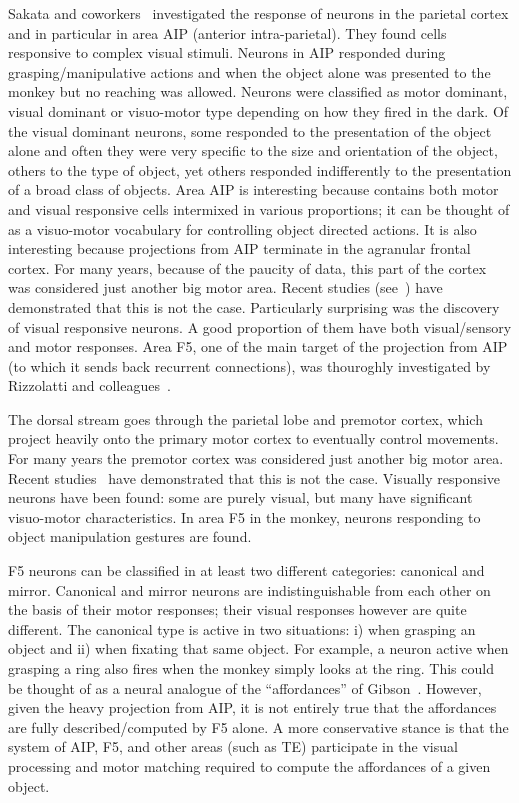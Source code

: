 Sakata and coworkers~\cite{sakata-taira-kusunoki-murata-tanaka-1997} 
investigated the response of neurons in the 
parietal cortex and in particular in area AIP (anterior intra-parietal). They found 
cells responsive to complex visual stimuli. Neurons in AIP responded during 
grasping/manipulative actions and when the object alone was presented to the 
monkey but no reaching was allowed. Neurons were classified as motor dominant, 
visual dominant or visuo-motor type depending on how they fired in the dark. Of 
the visual dominant neurons, some responded to the presentation of the 
object alone and often they were very specific to the size and orientation of the 
object, others to the type of object, yet others responded indifferently to the 
presentation of a broad class of objects. Area AIP is interesting because 
contains both motor and visual responsive cells intermixed in various proportions; 
it can be thought of as a visuo-motor vocabulary for controlling object directed 
actions. It is also interesting because projections from AIP terminate in the 
agranular frontal cortex. For many years, because of the paucity of data, this 
part of the cortex was considered just another big motor area. Recent studies 
(see~\cite{jeannerod97cognitive,fadiga00visuomotor}) have demonstrated 
that this is not the case. Particularly surprising was the discovery of visual 
responsive neurons. A good proportion of them have both visual/sensory and motor 
responses. Area F5, one of the main target of the projection from AIP (to which 
it sends back recurrent connections), was thouroghly investigated by Rizzolatti 
and colleagues~\cite{gallese-fadiga-fogassi-rizzolatti-1996}.

%
%
\ifverbose
The dorsal stream goes through the parietal lobe and premotor cortex,
which project heavily onto the primary motor cortex to eventually
control movements. For many years the premotor cortex was considered
just another big motor area.  Recent studies~\cite{jeannerod97cognitive} have demonstrated that this is not the
case.  Visually responsive neurons have been found: some are purely
visual, but many have significant visuo-motor characteristics. In area
F5 in the monkey, neurons responding to object manipulation gestures
are found.  
\fi

F5 neurons can be classified in at least two different categories:
canonical and mirror. Canonical and mirror neurons are 
indistinguishable from each other on the basis of their motor responses; 
their visual responses however are quite different. 
The canonical type is active in two situations:
i) when grasping an object and ii) when fixating that same object.
For example, a neuron active when grasping a ring also fires when the
monkey simply looks at the ring.  This could be thought of as a neural
analogue of the ``affordances'' of Gibson~\cite{gibson77theory}. 
However, given the heavy projection from AIP, it is not entirely
true that the affordances are fully described/computed by F5 alone.
A more conservative stance is that the system of AIP, F5, and other areas 
(such as TE) participate in the visual processing and motor matching required 
to compute the affordances of a given object.  


